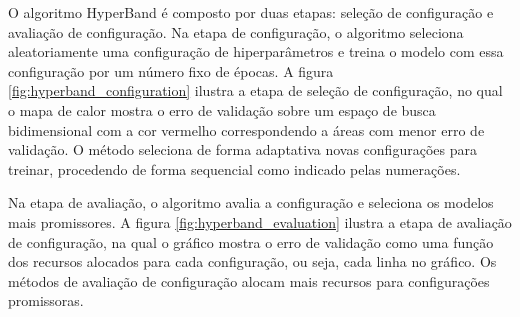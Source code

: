 
            \ipar O algoritmo HyperBand é composto por duas etapas: seleção de configuração e avaliação de configuração. Na etapa de configuração, o algoritmo seleciona aleatoriamente uma configuração de hiperparâmetros e treina o modelo com essa configuração por um número fixo de épocas. A figura \ref{fig:hyperband_configuration} ilustra a etapa de seleção de configuração, no qual o mapa de calor mostra o erro de validação sobre um espaço de busca bidimensional com a cor vermelho correspondendo a áreas com menor erro de validação. O método seleciona de forma adaptativa novas configurações para treinar, procedendo de forma sequencial como indicado pelas numerações.
            

            \ipar Na etapa de avaliação, o algoritmo avalia a configuração e seleciona os modelos mais promissores. A figura \ref{fig:hyperband_evaluation} ilustra a etapa de avaliação de configuração, na qual o gráfico mostra o erro de validação como uma função dos recursos alocados para cada configuração, ou seja, cada linha no gráfico. Os métodos de avaliação de configuração alocam mais recursos para configurações promissoras.

\pagebreak
